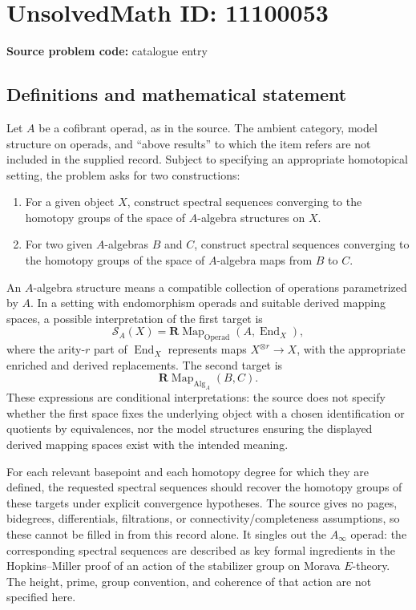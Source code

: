 \documentclass[11pt]{article}
\begin{document}
\section*{UnsolvedMath ID: 11100053}
\textbf{Source problem code:} catalogue entry
\subsection{Definitions and mathematical statement}
Let $A$ be a cofibrant operad, as in the source. The ambient category, model structure on operads, and ``above results'' to which the item refers are not included in the supplied record. Subject to specifying an appropriate homotopical setting, the problem asks for two constructions:
\begin{enumerate}
\item For a given object $X$, construct spectral sequences converging to the homotopy groups of the space of $A$-algebra structures on $X$.
\item For two given $A$-algebras $B$ and $C$, construct spectral sequences converging to the homotopy groups of the space of $A$-algebra maps from $B$ to $C$.
\end{enumerate}
An $A$-algebra structure means a compatible collection of operations parametrized by $A$. In a setting with endomorphism operads and suitable derived mapping spaces, a possible interpretation of the first target is
\[
 \mathcal S_A(X)=\mathbf R\operatorname{Map}_{\mathrm{Operad}}
       (A,\operatorname{End}_X),
\]
where the arity-$r$ part of $\operatorname{End}_X$ represents maps $X^{\otimes r}\to X$, with the appropriate enriched and derived replacements. The second target is
\[
 \mathbf R\operatorname{Map}_{\operatorname{Alg}_A}(B,C).
\]
These expressions are conditional interpretations: the source does not specify whether the first space fixes the underlying object with a chosen identification or quotients by equivalences, nor the model structures ensuring the displayed derived mapping spaces exist with the intended meaning.

For each relevant basepoint and each homotopy degree for which they are defined, the requested spectral sequences should recover the homotopy groups of these targets under explicit convergence hypotheses. The source gives no pages, bidegrees, differentials, filtrations, or connectivity/completeness assumptions, so these cannot be filled in from this record alone. It singles out the $A_{\infty}$ operad: the corresponding spectral sequences are described as key formal ingredients in the Hopkins--Miller proof of an action of the stabilizer group on Morava $E$-theory. The height, prime, group convention, and coherence of that action are not specified here.
\end{document}
